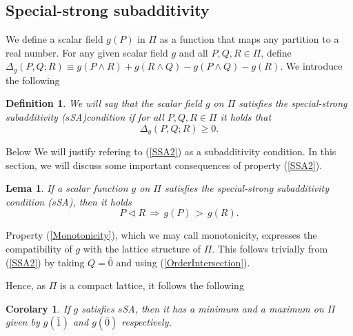 \documentclass[twocolumn,aps,sort,nofootinbib]{revtex4}
\newtheorem{lema}{Lema}[section]
\newtheorem{corolary}{Corolary}[section]
\newtheorem{definition}{Definition}
\begin{document}
\begin{appendix}
\subsection{Special-strong subadditivity}
We define a scalar field $g(P)$ in $\Pi$ as a function that maps any partition to a real number. 
For any given scalar field $g$ and all $P, Q, R \in \Pi$, define 
$\Delta_g\left(P,Q;R\right) \equiv g(P\wedge R)+g(R\wedge Q)-g(P\wedge Q)-g(R)$. 
We introduce the following 
\begin{definition}
We will say that the scalar field $g$ on $\Pi$
satisfies the special-strong subadditivity ($s$SA)condition if 
for all $P, Q, R \in \Pi$ it holds that
\begin{equation}
\Delta_g\left(P,Q;R\right) \geq 0.
\label{SSA2}
\end{equation}
\end{definition}
Below We will justify refering to (\ref{SSA2}) as a subadditivity condition.
In this section, we will discuss some important consequences
of property (\ref{SSA2}). 

\begin{lema}
If a scalar function $g$ on $\Pi$ satisfies the special-strong subadditivity
condition ($s$SA), then it holds
\begin{equation}
P \triangleleft R \,\Rightarrow\,g(P)\,>\,g(R). \label{Monotonicity}
\end{equation}
\end{lema}
Property (\ref{Monotonicity}), which we may call monotonicity, expresses 
the compatibility of  $g$ with the lattice structure of $\Pi$. This follows
trivially from (\ref{SSA2}) by taking $Q=\bar{0}$ %
and using (\ref{OrderIntersection}).

Hence, as $\Pi$ is a compact lattice, it follows the following 
\begin{corolary}
If $g$ satisfies $s$SA, then it has a minimum and a maximum on $\Pi$ given by 
$g(\bar{1})$ and $g(\bar{0})$ respectively. 
\end{corolary}


\end{appendix}
\end{document}

